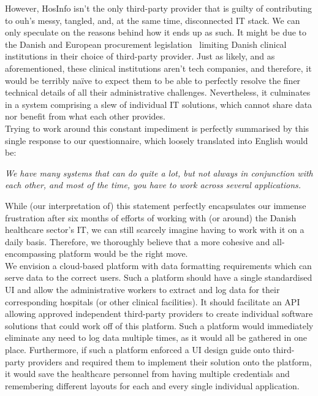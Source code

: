 However, HosInfo isn't the only third-party provider that is guilty of contributing to \acrshort{ouh}'s messy, tangled, and, at the same time, disconnected IT stack. We can only speculate on the reasons behind how it ends up as such. It might be due to the Danish and European procurement legislation~\cite{Udbudsloven, EU-Procurement-Legislation} limiting Danish clinical institutions in their choice of third-party provider. Just as likely, and as aforementioned, these clinical institutions aren't tech companies, and therefore, it would be terribly na\"ive to expect them to be able to perfectly resolve the finer technical details of all their administrative challenges. Nevertheless, it culminates in a system comprising a slew of individual IT solutions, which cannot share data nor benefit from what each other provides.
\\
Trying to work around this constant impediment is perfectly summarised by this single response to our questionnaire, which loosely translated into English would be:
\begin{center}
 \textit{We have many systems that can do quite a lot, but not always in conjunction with each other, and most of the time, you have to work across several applications.}
\end{center}
While (our interpretation of) this statement perfectly encapsulates our immense frustration after six months of efforts of working with (or around) the Danish healthcare sector's IT, we can still scarcely imagine having to work with it on a daily basis. Therefore, we thoroughly believe that a more cohesive and all-encompassing platform would be the right move.
\\
We envision a cloud-based platform with data formatting requirements which can serve data to the correct users. Such a platform should have a single standardised UI  and allow the administrative workers to extract and log data for their corresponding hospitals (or other clinical facilities). It should facilitate an API allowing approved independent third-party providers to create individual software solutions that could work off of this platform. Such a platform would immediately eliminate any need to log data multiple times, as it would all be gathered in one place. Furthermore, if such a platform enforced a UI design guide onto third-party providers and required them to implement their solution onto the platform, it would save the healthcare personnel from having multiple credentials and remembering different layouts for each and every single individual application.

